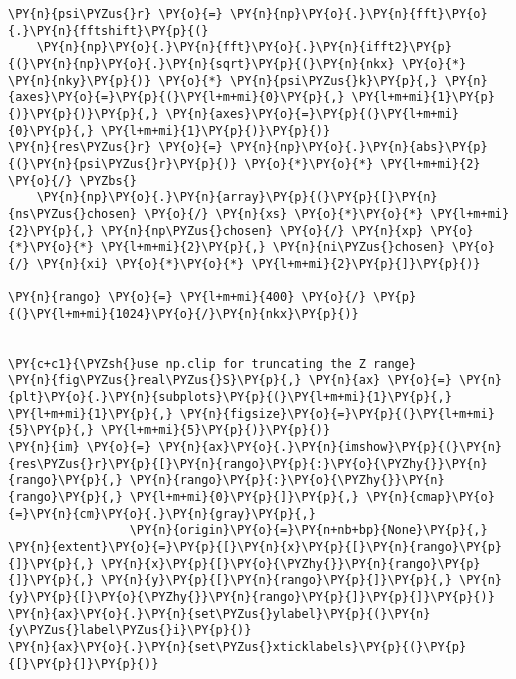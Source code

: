 \begin{Verbatim}[commandchars=\\\{\}]
\PY{n}{psi\PYZus{}r} \PY{o}{=} \PY{n}{np}\PY{o}{.}\PY{n}{fft}\PY{o}{.}\PY{n}{fftshift}\PY{p}{(}
    \PY{n}{np}\PY{o}{.}\PY{n}{fft}\PY{o}{.}\PY{n}{ifft2}\PY{p}{(}\PY{n}{np}\PY{o}{.}\PY{n}{sqrt}\PY{p}{(}\PY{n}{nkx} \PY{o}{*} \PY{n}{nky}\PY{p}{)} \PY{o}{*} \PY{n}{psi\PYZus{}k}\PY{p}{,} \PY{n}{axes}\PY{o}{=}\PY{p}{(}\PY{l+m+mi}{0}\PY{p}{,} \PY{l+m+mi}{1}\PY{p}{)}\PY{p}{)}\PY{p}{,} \PY{n}{axes}\PY{o}{=}\PY{p}{(}\PY{l+m+mi}{0}\PY{p}{,} \PY{l+m+mi}{1}\PY{p}{)}\PY{p}{)}
\PY{n}{res\PYZus{}r} \PY{o}{=} \PY{n}{np}\PY{o}{.}\PY{n}{abs}\PY{p}{(}\PY{n}{psi\PYZus{}r}\PY{p}{)} \PY{o}{*}\PY{o}{*} \PY{l+m+mi}{2} \PY{o}{/} \PYZbs{}
    \PY{n}{np}\PY{o}{.}\PY{n}{array}\PY{p}{(}\PY{p}{[}\PY{n}{ns\PYZus{}chosen} \PY{o}{/} \PY{n}{xs} \PY{o}{*}\PY{o}{*} \PY{l+m+mi}{2}\PY{p}{,} \PY{n}{np\PYZus{}chosen} \PY{o}{/} \PY{n}{xp} \PY{o}{*}\PY{o}{*} \PY{l+m+mi}{2}\PY{p}{,} \PY{n}{ni\PYZus{}chosen} \PY{o}{/} \PY{n}{xi} \PY{o}{*}\PY{o}{*} \PY{l+m+mi}{2}\PY{p}{]}\PY{p}{)}

\PY{n}{rango} \PY{o}{=} \PY{l+m+mi}{400} \PY{o}{/} \PY{p}{(}\PY{l+m+mi}{1024}\PY{o}{/}\PY{n}{nkx}\PY{p}{)}


\PY{c+c1}{\PYZsh{}use np.clip for truncating the Z range}
\PY{n}{fig\PYZus{}real\PYZus{}S}\PY{p}{,} \PY{n}{ax} \PY{o}{=} \PY{n}{plt}\PY{o}{.}\PY{n}{subplots}\PY{p}{(}\PY{l+m+mi}{1}\PY{p}{,} \PY{l+m+mi}{1}\PY{p}{,} \PY{n}{figsize}\PY{o}{=}\PY{p}{(}\PY{l+m+mi}{5}\PY{p}{,} \PY{l+m+mi}{5}\PY{p}{)}\PY{p}{)}
\PY{n}{im} \PY{o}{=} \PY{n}{ax}\PY{o}{.}\PY{n}{imshow}\PY{p}{(}\PY{n}{res\PYZus{}r}\PY{p}{[}\PY{n}{rango}\PY{p}{:}\PY{o}{\PYZhy{}}\PY{n}{rango}\PY{p}{,} \PY{n}{rango}\PY{p}{:}\PY{o}{\PYZhy{}}\PY{n}{rango}\PY{p}{,} \PY{l+m+mi}{0}\PY{p}{]}\PY{p}{,} \PY{n}{cmap}\PY{o}{=}\PY{n}{cm}\PY{o}{.}\PY{n}{gray}\PY{p}{,}
                 \PY{n}{origin}\PY{o}{=}\PY{n+nb+bp}{None}\PY{p}{,} \PY{n}{extent}\PY{o}{=}\PY{p}{[}\PY{n}{x}\PY{p}{[}\PY{n}{rango}\PY{p}{]}\PY{p}{,} \PY{n}{x}\PY{p}{[}\PY{o}{\PYZhy{}}\PY{n}{rango}\PY{p}{]}\PY{p}{,} \PY{n}{y}\PY{p}{[}\PY{n}{rango}\PY{p}{]}\PY{p}{,} \PY{n}{y}\PY{p}{[}\PY{o}{\PYZhy{}}\PY{n}{rango}\PY{p}{]}\PY{p}{]}\PY{p}{)}
\PY{n}{ax}\PY{o}{.}\PY{n}{set\PYZus{}ylabel}\PY{p}{(}\PY{n}{y\PYZus{}label\PYZus{}i}\PY{p}{)}
\PY{n}{ax}\PY{o}{.}\PY{n}{set\PYZus{}xticklabels}\PY{p}{(}\PY{p}{[}\PY{p}{]}\PY{p}{)}


\end{Verbatim}
